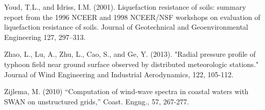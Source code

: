 Youd, T.L., and Idriss, I.M. (2001). Liquefaction resistance of soils: summary report from the 1996 NCEER and 1998 NCEER/NSF workshops on evaluation of liquefaction resistance of soils. Journal of Geotechnical and Geoenvironmental Engineering 127, 297–313.

Zhao, L., Lu, A., Zhu, L., Cao, S., and Ge, Y. (2013). "Radial pressure profile of typhoon field near ground surface observed by distributed meteorologic stations." Journal of Wind Engineering and Industrial Aerodynamics, 122, 105-112.

Zijlema, M. (2010) “Computation of wind-wave spectra in coastal waters with SWAN on unstructured grids,” Coast. Engng., 57, 267-277.

 
 
%
